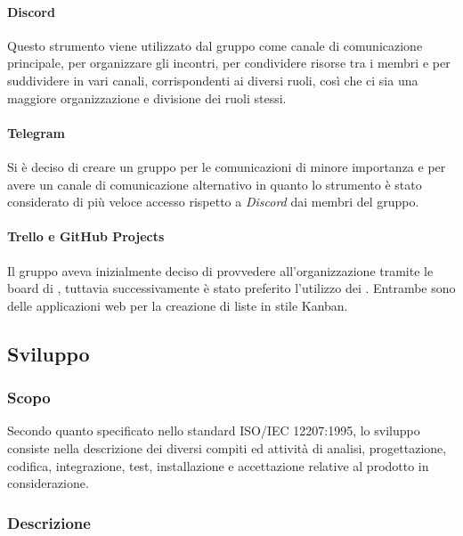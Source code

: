 \paragraph{Discord}

Questo strumento viene utilizzato dal gruppo come canale di comunicazione principale, per organizzare gli incontri, per
condividere risorse tra i membri e per suddividere in vari canali, corrispondenti ai diversi ruoli, così che ci sia una
maggiore organizzazione e divisione dei ruoli stessi.

\paragraph{Telegram}

Si è deciso di creare un gruppo  per le comunicazioni di minore importanza e per avere un canale di
comunicazione alternativo in quanto lo strumento è stato considerato di più veloce accesso rispetto a \emph{Discord}
dai membri del gruppo.

\paragraph{Trello e GitHub Projects}

Il gruppo aveva inizialmente deciso di provvedere all'organizzazione tramite le board di , tuttavia
successivamente è stato preferito l'utilizzo dei . Entrambe sono delle applicazioni web per
la creazione di liste in stile Kanban.

\subsection{Sviluppo}

\subsubsection{Scopo}

Secondo quanto specificato nello standard \textsc{ISO/IEC  12207:1995}, lo sviluppo consiste nella descrizione dei
diversi compiti ed attività di analisi, progettazione, codifica, integrazione, test, installazione e accettazione
relative al prodotto in considerazione.

\subsubsection{Descrizione}

